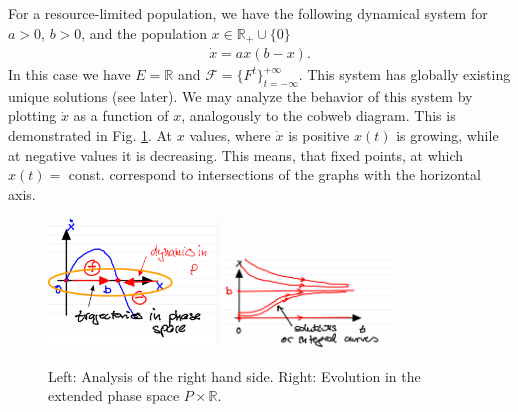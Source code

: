 \begin{ex}
	For a resource-limited population, we have the following dynamical system for $a> 0$, $b> 0$, and the population $x\in \mathbb{R}_+ \cup \{0\}$
	\begin{align}
		\dot{x} = ax(b-x).
	\end{align}
	In this case we have $E=\mathbb{R}$ and $\mathcal{F} = \{F^{t}\}_{t=-\infty }^{+\infty }$. This system has globally existing unique solutions (see later). We may analyze the behavior of this system by plotting $\dot{x}$ as a function of $x$, analogously to the cobweb diagram. This is demonstrated in Fig. \ref{fig:cds_analysis}. At $x$ values, where $\dot{x}$ is positive $x(t)$ is growing, while at negative values it is decreasing. This means, that fixed points, at which $x(t)=$ const. correspond to intersections of the graphs with the horizontal axis.
	\begin{figure}[h!]
		\centering
		\includegraphics[width=0.4\textwidth]{figures/intro/3RHS.png}	
		\hspace{0.05\textwidth}
		\includegraphics[width=0.4\textwidth]{figures/intro/4solutions.png}
		\caption{Left: Analysis of the right hand side. Right: Evolution in the extended phase space $P \times \mathbb{R}$.} \label{fig:cds_analysis}
	\end{figure}

\end{ex}

